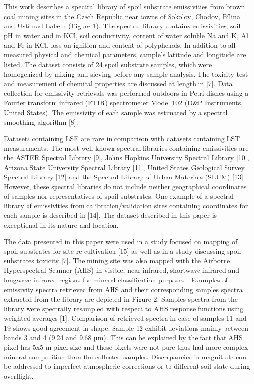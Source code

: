 This work describes a spectral library of spoil substrate emissivities from brown coal mining sites in the Czech Republic near towns of Sokolov, Chodov, Bílina and Ustí nad Labem (Figure 1). The spectral library contains emissivities, soil pH in water and in KCl, soil conductivity, content of water soluble Na and K, Al and Fe in KCl, loss on ignition and content of polyphenols. In addition to all measured physical and chemical parameters, sample’s latitude and longitude are listed. The dataset consists of 24 spoil substrate samples, which were homogenized by mixing and sieving before any sample analysis. The toxicity test and measurement of chemical properties are discussed at length in [7]. Data collection for emissivity retrievals was performed outdoors in Petri dishes using a Fourier transform infrared (FTIR) spectrometer Model 102 (D\&P Instruments, United States). The emissivity of each sample was estimated by a spectral smoothing algorithm [8].

Datasets containing LSE are rare in comparison with datasets containing LST measurements. The most well-known spectral libraries containing emissivities are the ASTER Spectral Library [9], Johns Hopkins University Spectral Library [10], Arizona State University Spectral Library [11], United States Geological Survey Spectral Library [12] and the Spectral Library of Urban Materials (SLUM) [13]. However, these spectral libraries do not include neither geographical coordinates of samples nor representatives of spoil substrates. One example of a spectral library of emissivities from calibration/validation sites containing coordinates for each sample is described in [14]. The dataset described in this paper is exceptional in its nature and location. 

The data presented in this paper were used in a study focused on mapping of spoil substrates for site re-cultivation [15] as well as in a study discussing spoil substrates toxicity [7]. The mining site was also mapped with the Airborne Hyperspectral Scanner (AHS) in visible, near infrared, shortwave infrared and longwave infrared regions for mineral classification purposes \cite{NK14}. Examples of emissivity spectra retrieved from AHS and their corresponding samples spectra extracted from the library are depicted in Figure 2. Samples spectra from the library were spectrally resampled with respect to AHS response functions using weighted averages [1]. Comparison of retrieved spectra in case of samples 11 and 19 shows good agreement in shape. Sample 12 exhibit deviations mainly between bands 3 and 4 (9.24 and 9.68 µm). This can be explained by the fact that AHS pixel has 5x5 m pixel size and these pixels were not pure thus had more complex mineral composition than the collected samples. Discrepancies in magnitude can be addressed to imperfect atmospheric corrections or to different soil state during overflight.

